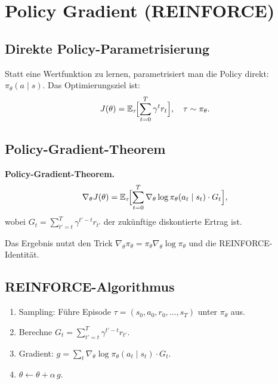 \documentclass[11pt]{article}
\theoremstyle{csthm}
\theoremstyle{csdef}
\newcommand{\E}{\mathbb{E}}
\begin{document}
\section{Policy Gradient (REINFORCE)}

\subsection{Direkte Policy-Parametrisierung}

Statt eine Wertfunktion zu lernen, parametrisiert man die Policy direkt:
$\pi_\theta(a \mid s)$. Das Optimierungsziel ist:
\begin{equation}
  J(\theta) = \E_\tau\!\Bigl[\sum_{t=0}^T \gamma^t r_t\Bigr],
  \quad \tau \sim \pi_\theta.
\end{equation}

\subsection{Policy-Gradient-Theorem}

\begin{tcolorbox}[thmstyle]
\textbf{Policy-Gradient-Theorem.}
\[
  \nabla_\theta J(\theta)
  = \E_\tau\!\Bigl[\sum_{t=0}^T \nabla_\theta \log\pi_\theta(a_t \mid s_t)
    \cdot G_t\Bigr],
\]
wobei $G_t = \sum_{t'=t}^T \gamma^{t'-t} r_{t'}$ der zukünftige diskontierte
Ertrag ist.
\end{tcolorbox}

Das Ergebnis nutzt den Trick
$\nabla_\theta \pi_\theta = \pi_\theta \nabla_\theta \log\pi_\theta$ und
die REINFORCE-Identität.

\subsection{REINFORCE-Algorithmus}

\begin{tcolorbox}[algostyle, title={REINFORCE}]
\begin{enumerate}[leftmargin=*, itemsep=2pt]
  \item Sampling: Führe Episode $\tau = (s_0, a_0, r_0, \ldots, s_T)$ unter
        $\pi_\theta$ aus.
  \item Berechne $G_t = \sum_{t'=t}^T \gamma^{t'-t} r_{t'}$.
  \item Gradient: $g = \sum_t \nabla_\theta \log\pi_\theta(a_t \mid s_t) \cdot G_t$.
  \item $\theta \leftarrow \theta + \alpha\, g$.
\end{enumerate}
\end{tcolorbox}
\end{document}
